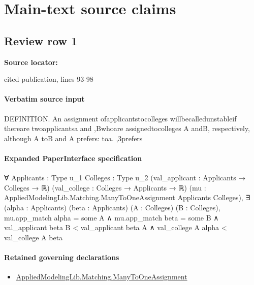 \documentclass[10pt]{article}
\begin{document}
\section*{Main-text source claims}
\subsection*{Review row 1}
\textbf{Source locator:} {\footnotesize\raggedright cited publication, lines 93-\allowbreak{}98\par}
\paragraph{Verbatim source input}
\begin{ReviewVerbatim}
DEFINITION. An assignment  ofapplicantstocolleges
                                                   willbecalledunstableif
thereare twoapplicantsa and ,Bwhoare assignedtocolleges
                                                      A andB, respectively,
although        A toB and A prefers: toa.
        ,3prefers
\end{ReviewVerbatim}



\paragraph{Expanded PaperInterface specification}
\begin{ReviewVerbatim}
∀ {Applicants : Type u_1} {Colleges : Type u_2} (val_applicant : Applicants → Colleges → ℝ)
  (val_college : Colleges → Applicants → ℝ) (mu : AppliedModelingLib.Matching.ManyToOneAssignment Applicants Colleges),
  ∃ (alpha : Applicants) (beta : Applicants) (A : Colleges) (B : Colleges),
    mu.app_match alpha = some A ∧
      mu.app_match beta = some B ∧
        val_applicant beta B < val_applicant beta A ∧ val_college A alpha < val_college A beta
\end{ReviewVerbatim}

\paragraph{Retained governing declarations}
\begin{itemize}\raggedright
\item \hyperlink{governing-declaration-5f205dc5e20311a8}{Applied\allowbreak{}Modeling\allowbreak{}Lib.\allowbreak{}Matching.\allowbreak{}Many\allowbreak{}To\allowbreak{}One\allowbreak{}Assignment}
\end{itemize}
\end{document}
